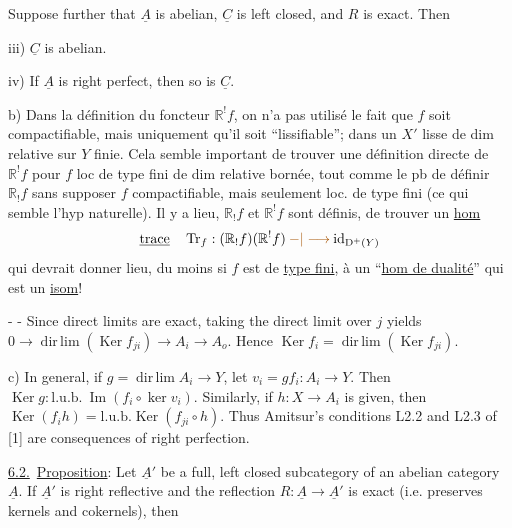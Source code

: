Suppose further that $\underline A$ is abelian, $\underline C$ is left closed, and $R$ is exact. Then

iii) $\underline C$ is abelian.

iv) If $\underline A$ is right perfect, then so is $\underline C$.

b) Dans la définition du foncteur $\mathbb{R}^!f$, on n'a pas utilisé le fait que $f$ soit compactifiable, mais uniquement qu'il soit ``lissifiable'';  dans un $X'$ lisse de dim relative sur $Y$ finie.
Cela semble   important de trouver une définition directe de $\mathbb{R}^!f$ pour $f$ loc de type fini de dim relative bornée, tout comme le pb de définir $\mathbb{R}_!f$ sans supposer $f$ compactifiable, mais seulement loc. de type fini (ce qui semble l'hyp naturelle).
Il y a lieu,  $\mathbb{R}_!f$ et $\mathbb{R}^!f$ sont définis, de trouver un \uline{hom}
\[
\uline{\text{trace}}\quad
\operatorname{Tr}_f:(\mathbb{R}_!f)(\mathbb{R}^!f)\mathbin{\unsure{-|\longrightarrow}}
\operatorname{id}_{\mathrm D^+(Y)}
\]
qui devrait donner lieu, du moins si $f$ est de \uline{type fini}, à un ``\uline{hom de dualité}'' qui est un \uline{isom}!

-  -
Since direct limits are exact, taking the direct limit over $j$ yields $0\longrightarrow\operatorname{dir\,lim}(\operatorname{Ker}f_{ji})\longrightarrow A_i\longrightarrow A_o$.
Hence $\operatorname{Ker}f_i=\operatorname{dir\,lim}(\operatorname{Ker}f_{ji})$.

c) In general, if $g=\operatorname{dir\,lim}A_i\longrightarrow Y$, let $v_i=gf_i:A_i\longrightarrow Y$. Then $\operatorname{Ker}g:\mathrm{l.u.b.}\ \operatorname{Im}(f_i\circ\operatorname{ker}v_i)$.
Similarly, if $h:X\longrightarrow A_i$ is given, then $\operatorname{Ker}(f_i h)=\mathrm{l.u.b.}\operatorname{Ker}(f_{ji}\circ h)$. Thus Amitsur's conditions L2.2 and L2.3 of [1]  are consequences of right perfection.

\uline{6.2.}\ \uline{Proposition}: Let $\underline A'$ be a full, left closed subcategory of an abelian category $\underline A$. If $\underline A'$ is right reflective and the reflection $R:\underline A\longrightarrow\underline A'$ is exact (i.e. preserves kernels and cokernels), then

